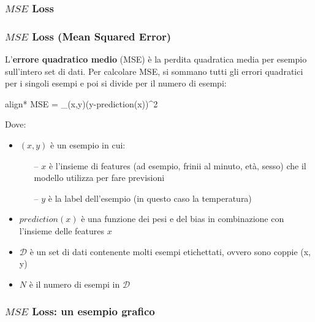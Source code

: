 \subsubsection[$MSE$ Loss]{$MSE$ Loss}
\begin{frame}

	\frametitle{$MSE$ Loss (Mean Squared Error)}

		L'\textbf{errore quadratico medio} (MSE) è la perdita quadratica media per esempio sull'intero set di dati. Per calcolare MSE, si sommano tutti gli errori quadratici per i singoli esempi e poi si divide per il numero di esempi:

		\begin{scriptsize}
		\begin{empheq}[box=\fcolorbox{blue!40!black!60}{yellow!10}]{align*}
			MSE =  \sum_{(x,y)\in{}}(y-prediction(x))^2
		\end{empheq}
		\end{scriptsize}

		Dove:
		\begin{itemize}
			\item $(x, y)$ è un esempio in cui:
				\begin{itemize}
					\item[--] $x$ è l'insieme di features (ad esempio, frinii al minuto, età, sesso) che il modello utilizza per fare previsioni
					\item[--] $y$ è la label dell'esempio (in questo caso la temperatura)
				\end{itemize}
			\item $prediction(x)$ è una funzione dei pesi e del bias in combinazione con l'insieme delle features $x$
			\item $\mathcal{D}$ è un set di dati contenente molti esempi etichettati, ovvero sono coppie (x, y)
			\item $N$ è il numero di esempi in $\mathcal{D}$

		\end{itemize}


\end{frame}


\begin{frame}

	\frametitle{$MSE$ Loss: un esempio grafico}

		\centering

\end{frame}

